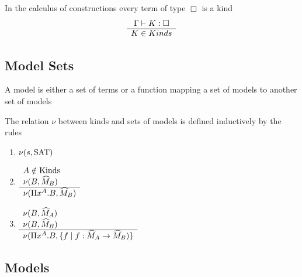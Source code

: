 \begin{lemma}
  In the calculus of constructions every term of type $\Box$ is a kind
  $$
  \begin{array}{c} \Gamma \vdash K: \Box \\ \hline K \in Kinds\end{array}
  $$
\end{lemma}



\subsection{Model Sets}

\begin{definition} %
  A model is either a set of terms or a function mapping a set of models to
  another set of models
\end{definition}


\begin{definition} %
  The relation $\nu$ between kinds and sets of models is defined inductively
  by the rules
  \begin{enumerate}
  \item $\nu(s,\text{SAT})$

  \item $\begin{array}{l} A \notin \text{Kinds} \\ \nu(B,\widehat{M}_B) \\ \hline \nu(\Pi x^A.B, \widehat{M}_B)\end{array}$

  \item $\begin{array}{l}  \nu(B,\widehat{M}_A) \\ \nu(B,\widehat{M}_B) \\ \hline \nu(\Pi x^A.B, \{f \mid f: \widehat{M}_A \to \widehat{M}_B)\}\end{array}$
  \end{enumerate}
\end{definition}



\subsection{Models}